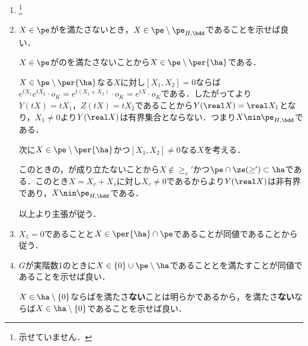 \begin{npfwn}
  \leavevmode\vspace{-1em}
  \begin{enumerate}
  \item {}\footnote{示せていません．}
    
  \item $X\in \pe$がを満たさないとき，$X\in \pe\setminus\pe_{H,\bdd} $であることを示せば良い．
    
    $X\in \pe$がのを満たさないことから$X\in\pe\setminus\per{\ha} $である．

    $X\in \pe\setminus\per{\ha} $なる$X$に対し$[X_1,X_2] = 0$ならば$e^{tX_1}e^{tX_2}\cdot o_K = e^{t(X_1 + X_2)}\cdot o_K = e^{tX}\cdot o_K$である．したがってより$Y(tX) = tX_1 $，$Z(tX) = tX_2 $であることから$Y(\real X) = \real X_1 $となり，$X_1\neq 0$より$Y(\real X)$は有界集合とならない．つまり$X\nin\pe_{H,\bdd} $である．

    次に$X\in \pe\setminus \per{\ha} $かつ$[X_1,X_2] \neq 0$なる$X$を考える．

    このときの，が成り立たないことから$X\nin \ge_{s}' $かつ$\pe\cap \ze(\ge')\subset \ha $である．このとき$X = X_c + X_s $に対し$X_c\neq 0$であるからより$Y(\real X)$は非有界であり，$X\nin\pe_{H,\bdd} $である．


    以上より主張が従う．
  \item $X_1 = 0$であることと$ X\in \per{\ha}\cap\pe $であることが同値であることから従う．
  \item $G$が実階数1のときに$X\in \{0\}\cup \pe\setminus \ha $であることとを満たすことが同値であることを示せば良い．

    $X\in\ha\setminus\{0\} $ならばを満たさ\textbf{ない}ことは明らかであるから，を満たさ\textbf{ない}ならば$X\in\ha\setminus\{0\} $であることを示せば良い．


\end{enumerate}
\end{npfwn}

